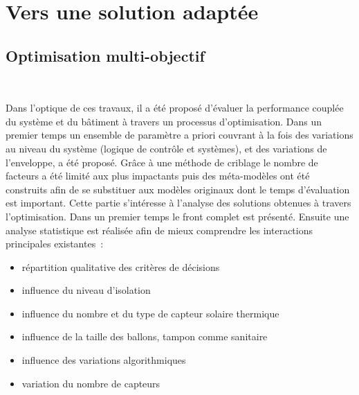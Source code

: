 



\section{Vers une solution adaptée} %
\label{sec:vers_une_solution_adaptee}
\subsection{Optimisation multi-objectif} %
\label{sub:optimisation_multi_objectif}
~

Dans l’optique de ces travaux, il a été proposé d’évaluer la performance couplée
du système et du bâtiment à travers un processus d’optimisation. Dans un premier temps
un ensemble de paramètre a priori couvrant à la fois des variations
au niveau du système (logique de contrôle et systèmes), et des variations de l’enveloppe,
a été proposé. Grâce à une méthode de criblage le nombre de facteurs a été limité
aux plus impactants puis des méta-modèles ont été construits afin de se substituer
aux modèles originaux dont le temps d’évaluation est important.
Cette partie s’intéresse à l’analyse des solutions obtenues à travers l’optimisation.
Dans un premier temps le front complet est présenté. Ensuite une analyse statistique
est réalisée afin de mieux comprendre les interactions principales existantes~:
\begin{itemize}
  \item répartition qualitative des critères de décisions
  \item influence du niveau d’isolation
  \item influence du nombre et du type de capteur solaire thermique
  \item influence de la taille des ballons, tampon comme sanitaire
  \item influence des variations algorithmiques
  \item variation du nombre de capteurs 
\end{itemize}


